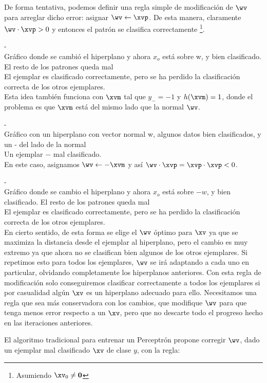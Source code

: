 De forma tentativa, podemos definir una regla simple de modificación de $\wv$ para arreglar dicho error: asignar $\wv \leftarrow \xvp$. De esta manera, claramente $\wv \cdot \xvp>0 $ y entonces el patrón se clasifica correctamente \footnote{Asumiendo $\xv_0 \neq \mathbf{0}$}. 

-\\
Gráfico donde se cambió el hiperplano y ahora $x_o$ está sobre w, y bien clasificado. El resto de los patrones queda mal\\ El ejemplar es clasificado correctamente, pero se ha perdido la clasificación correcta de los otros ejemplares.\\

Esta idea también funciona con $\xvm$ tal que $y_{-}=-1$ y $h(\xvm)=1$, donde el problema es que $\xvm$ está del mismo lado que la normal $\wv$.

-\\
Gráfico con un hiperplano con vector normal w, algunos datos bien clasificados, y un - del lado de la normal\\
Un ejemplar $-$ mal clasificado.\\

En este caso, asignamos $\wv \leftarrow -\xvm$ y así $\wv \cdot \xvp = \xvp \cdot \xvp <0$.

-\\
Gráfico donde se cambio el hiperplano y ahora $x_o$ está sobre $-w$, y bien clasificado. El resto de los patrones queda mal\\
El ejemplar es clasificado correctamente, pero se ha perdido la clasificación correcta de los otros ejemplares.\\

En cierto sentido, de esta forma se elige el $\wv$ óptimo para $\xv$ ya que se maximiza la distancia desde el ejemplar al hiperplano, pero el cambio es muy extremo ya que ahora no se clasifican bien algunos de los otros ejemplares. Si repetimos esto para todos los ejemplares, $\wv$ se irá adaptando a cada uno en particular, olvidando completamente los hiperplanos anteriores. Con esta regla de modificación solo conseguiremos clasificar correctamente a todos los ejemplares si por casualidad algún $\xv$ es un hiperplano adecuado para ello. Necesitamos una regla que sea más conservadora con los cambios, que modifique $\wv$ para que tenga menos error respecto a un $\xv$, pero que no descarte todo el progreso hecho en las iteraciones anteriores.

El algoritmo tradicional para entrenar un Perceptrón propone corregir $\wv$, dado un ejemplar mal clasificado $\xv$ de clase $y$, con la regla:


